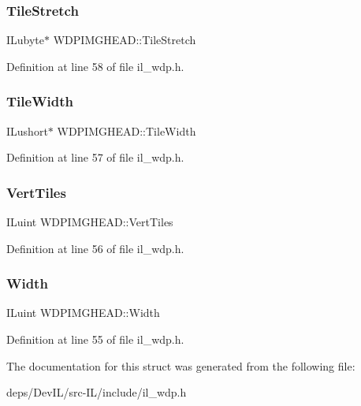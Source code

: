 \subsubsection{\texorpdfstring{Tile\+Stretch}{TileStretch}}
{\footnotesize\ttfamily I\+Lubyte$\ast$ W\+D\+P\+I\+M\+G\+H\+E\+A\+D\+::\+Tile\+Stretch}



Definition at line 58 of file il\+\_\+wdp.\+h.

\mbox{\label{structWDPIMGHEAD_a5bf3a286ab54e55f115072c1ee0da14b}} 
\subsubsection{\texorpdfstring{Tile\+Width}{TileWidth}}
{\footnotesize\ttfamily I\+Lushort$\ast$ W\+D\+P\+I\+M\+G\+H\+E\+A\+D\+::\+Tile\+Width}



Definition at line 57 of file il\+\_\+wdp.\+h.

\mbox{\label{structWDPIMGHEAD_a6edfab3156c66c12db3a37317c08ad0a}} 
\subsubsection{\texorpdfstring{Vert\+Tiles}{VertTiles}}
{\footnotesize\ttfamily I\+Luint W\+D\+P\+I\+M\+G\+H\+E\+A\+D\+::\+Vert\+Tiles}



Definition at line 56 of file il\+\_\+wdp.\+h.

\mbox{\label{structWDPIMGHEAD_a5868e2caeb0cc61dcade9ee2ad1749a3}} 
\subsubsection{\texorpdfstring{Width}{Width}}
{\footnotesize\ttfamily I\+Luint W\+D\+P\+I\+M\+G\+H\+E\+A\+D\+::\+Width}



Definition at line 55 of file il\+\_\+wdp.\+h.



The documentation for this struct was generated from the following file\+:\begin{DoxyCompactItemize}
\item 
deps/\+Dev\+I\+L/src-\/\+I\+L/include/il\+\_\+wdp.\+h\end{DoxyCompactItemize}
